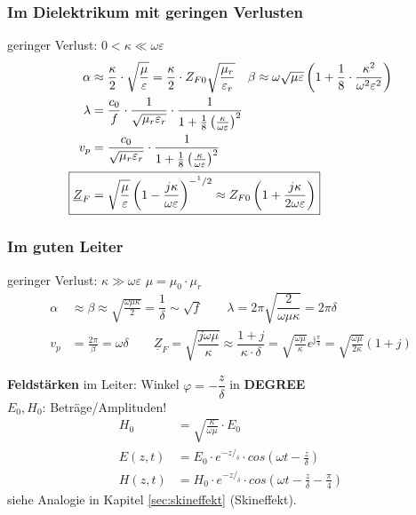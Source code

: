 \subsubsection{Im Dielektrikum mit geringen Verlusten}
geringer Verlust: $0 < \kappa \ll\omega\varepsilon$
\begin{align*}
    \alpha                  & \approx\dfrac{\kappa}{2}\cdot\sqrt{\dfrac{\mu}{\varepsilon}} = \frac{\kappa}{2}\cdot Z_{F0}\sqrt{\frac{\mu_r}{\varepsilon_r}}  \quad 
    \beta \approx\omega\sqrt{\mu\varepsilon}\left(1+\dfrac{1}{8}\cdot\dfrac{\kappa^2}{\omega^2\varepsilon^2}\right)                                                  \\
    \lambda                 & = \dfrac{c_0}{f}\cdot\dfrac{1}{\sqrt{\mu_r\varepsilon_r}}\cdot\frac{1}{1+\frac{1}{8}\left(\frac{\kappa}{\omega\varepsilon}\right)^2}                       \\
    v_p                     & = \dfrac{c_0}{\sqrt{\mu_r\varepsilon_r}}\cdot\frac{1}{1+\frac{1}{8}\left(\frac{\kappa}{\omega\varepsilon}\right)^2}                                        \\
    \Aboxed{\underline{Z}_F & = \sqrt{\dfrac{\mu}{\varepsilon}}\left(1-\frac{j\kappa}{\omega\varepsilon}\right)^{-^1/2} \approx Z_{F0}\left(1+\frac{j\kappa}{2\omega\varepsilon}\right)}
\end{align*}

\subsubsection{Im guten Leiter}\label{sec:Ausbreitug_guter_Leiter}
geringer Verlust: $\kappa \gg\omega\varepsilon$ \quad $\mu = \mu_0 \cdot \mu_r$
\begin{align*}
    \alpha                  & \approx \beta \approx\sqrt{\frac{\omega\mu\kappa}{2}}=\dfrac{1}{\delta}\sim\sqrt{f} \qquad
    \lambda                 = 2\pi \sqrt{\dfrac{2}{\omega\mu\kappa}}=2\pi\delta                                 \\
    v_p                     & = \frac{2\pi}{\beta} = \omega\delta        \qquad                                        
    \boxed{\underline{Z}_F = \sqrt{\dfrac{j\omega\mu}{\kappa}} \approx \dfrac{1+j}{\kappa\cdot\delta} = \sqrt{\frac{\omega \mu}{\kappa}}e^{\mathrm{j}\frac{\pi}{4}} = \sqrt{\frac{\omega \mu}{2 \kappa}}(1+j)   }
\end{align*}

\textbf{Feldstärken} im Leiter: \qquad Winkel $\varphi = - \dfrac{z}{\delta}$ in \textbf{DEGREE}\\
$E_0, H_0$: Beträge/Amplituden!
\begin{align*}
	H_0 &= \sqrt{\frac{\kappa}{\omega \mu}}\cdot E_0\\
	E(z,t) &= E_0 \cdot e^{- z/_\delta}\cdot cos(\omega t-\frac{z}{\delta})\\
	H(z,t) &= H_0 \cdot e^{- z/_\delta}\cdot cos(\omega t- \frac{z}{\delta}-\frac{\pi}{4})
\end{align*}
siehe Analogie in Kapitel \ref{sec:skineffekt} (Skineffekt).
